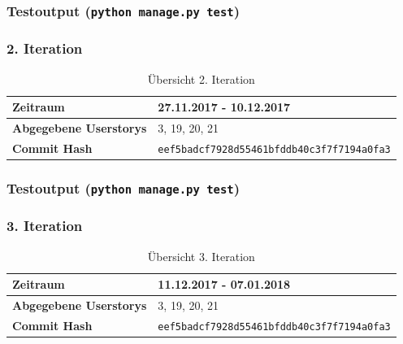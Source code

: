 \documentclass[accentcolor=tud9c,12pt,paper=a4]{tudreport}
\begin{document}
	\subsubsection{Testoutput (\texttt{python manage.py test})}
	

	\subsubsection{2. Iteration}
	\begin{table}[H]
	\begin{center}
		\begin{tabular}{| l | l |}
			\hline
			\textbf{Zeitraum} & 27.11.2017 - 10.12.2017\\\hline
			\textbf{Abgegebene Userstorys} & 3, 19, 20, 21\\\hline
			\textbf{Commit Hash} & \texttt{eef5badcf7928d55461bfddb40c3f7f7194a0fa3} \\\hline
		\end{tabular}
		\caption{Übersicht 2. Iteration}
	\end{center}
	\end{table}
	\subsubsection{Testoutput (\texttt{python manage.py test})}
	

	\subsubsection{3. Iteration}
	\begin{table}[H]
	\begin{center}
		\begin{tabular}{| l | l |}
			\hline
			\textbf{Zeitraum} & 11.12.2017 - 07.01.2018\\\hline
			\textbf{Abgegebene Userstorys} & 3, 19, 20, 21\\\hline
			\textbf{Commit Hash} & \texttt{eef5badcf7928d55461bfddb40c3f7f7194a0fa3} \\\hline
		\end{tabular}
		\caption{Übersicht 3. Iteration}
	\end{center}
	\end{table}
\end{document}
